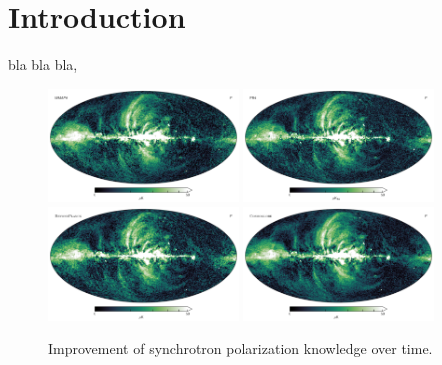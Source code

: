 \documentclass[twocolumn]{../../common/aa}
\begin{document}
\maketitle

\tableofcontents




\section{Introduction}
\label{sec:introduction}
bla bla bla, 


\begin{figure}
	\includegraphics[width=0.45\textwidth]{figures/polint_WMAP9.png}
	\includegraphics[width=0.45\textwidth]{figures/polint_PR4.png}
	\includegraphics[width=0.45\textwidth]{figures/polint_BP.png}
	\includegraphics[width=0.45\textwidth]{figures/polint_CG.png}
	\caption{
		Improvement of synchrotron polarization knowledge over time.
		}
       \label{fig:synch_polint}
\end{figure}
\end{document}
